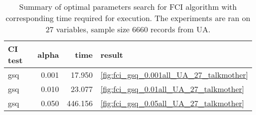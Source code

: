 \begin{table}
\caption{Summary of optimal parameters search for FCI algorithm with corresponding time required for execution. The experiments are ran on 27 variables, sample size 6660 records from UA.}
\label{tab:fci_parameters_time_UA_27_talkmother}
\begin{tabular}{lrrl}
\toprule
CI test & alpha & time & result \\
\midrule
gsq & 0.001 & 17.950 & \ref{fig:fci_gsq_0.001all_UA_27_talkmother} \\
gsq & 0.010 & 23.077 & \ref{fig:fci_gsq_0.01all_UA_27_talkmother} \\
gsq & 0.050 & 446.156 & \ref{fig:fci_gsq_0.05all_UA_27_talkmother} \\
\bottomrule
\end{tabular}
\end{table}
